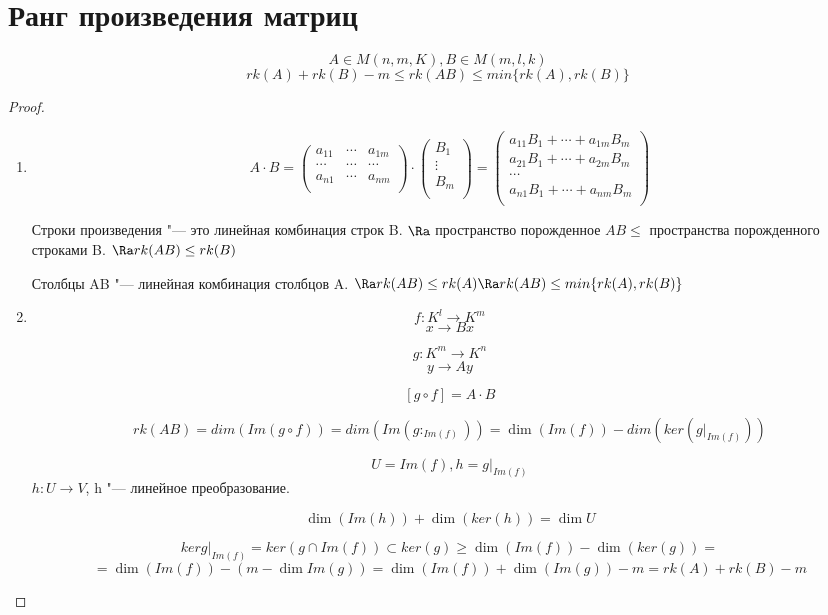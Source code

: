 ﻿\section{Ранг произведения матриц}
\begin{theorem}
$$A \in M(n, m, K), B \in M(m, l, k)$$
$$rk(A) + rk(B) - m \le rk(AB) \le min\{rk(A), rk(B)\}$$
\end{theorem}

\begin{proof}
\begin{enumerate}
\item
$$A \cdot B = 
\begin{pmatrix}
a_{11}&\cdots&a_{1m}\\
\cdots&\cdots&\cdots\\
a_{n1}&\cdots&a_{nm}\\
\end{pmatrix} \cdot
\begin{pmatrix}
B_1\\
\vdots\\
B_m\\
\end{pmatrix}
=
\begin{pmatrix}
a_{11}B_1 + \cdots + a_{1m}B_m\\
a_{21}B_1 + \cdots + a_{2m}B_m\\
\cdots\\
a_{n1}B_1 + \cdots + a_{nm}B_m\\
\end{pmatrix}$$

Строки произведения "--- это линейная комбинация строк B. $\Ra$
пространство порожденное $AB \le$ пространства порожденного строками B.
$\Ra rk(AB) \le rk(B)$

Столбцы AB "--- линейная комбинация столбцов A.
$\Ra rk(AB) \le rk(A) \Ra rk(AB) \le min\{rk(A), rk(B)\}$
\item
$$f \colon K^{l} \to K^{m}$$
$$x \to Bx$$

$$g \colon K^{m} \to K^{n}$$
$$y \to Ay$$

$$[g \circ f]  = A \cdot B$$

$$rk(AB) = dim(Im(g \circ f)) = dim(Im(g \colon_{Im(f)})) = 
\dim(Im(f)) - dim(ker(g |_{Im(f)}))$$

$$U = Im(f), h = g|_{Im(f)}$$
$h\colon U \to V$, h "--- линейное преобразование.

$$\dim(Im(h)) + \dim(ker(h)) = \dim U$$

$$ker g|_{Im(f)} = ker(g \cap Im(f)) \subset ker(g) \ge 
\dim(Im(f)) - \dim(ker(g)) = $$
$$= \dim(Im(f)) - (m - \dim Im(g)) = \dim(Im(f)) + \dim(Im(g)) - m = rk(A) + rk(B) - m$$
\end{enumerate}
\end{proof}
